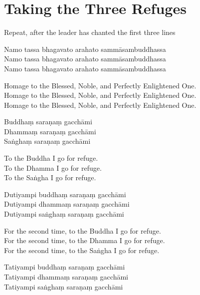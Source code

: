 \clearpage
\chapter{Taking the Three Refuges}%

\begin{instruction}
  Repeat, after the leader has chanted the first three lines
\end{instruction}

Namo tassa bhagavato arahato sammāsambuddhassa\\
Namo tassa bhagavato arahato sammāsambuddhassa\\
Namo tassa bhagavato arahato sammāsambuddhassa

\begin{english}
  Homage to the Blessed, Noble, and Perfectly Enlightened One.\\
  Homage to the Blessed, Noble, and Perfectly Enlightened One.\\
  Homage to the Blessed, Noble, and Perfectly Enlightened One.
\end{english}

Buddhaṃ saraṇaṃ gacchāmi\\
Dhammaṃ saraṇaṃ gacchāmi\\
Saṅghaṃ saraṇaṃ gacchāmi

\begin{english}
  To the Buddha I go for refuge.\\
  To the Dhamma I go for refuge.\\
  To the Saṅgha I go for refuge.
\end{english}

Dutiyampi buddhaṃ saraṇaṃ gacchāmi\\
Dutiyampi dhammaṃ saraṇaṃ gacchāmi\\
Dutiyampi saṅghaṃ saraṇaṃ gacchāmi

\begin{english}
  For the second time, to the Buddha I go for refuge.\\
  For the second time, to the Dhamma I go for refuge.\\
  For the second time, to the Saṅgha I go for refuge.
\end{english}

Tatiyampi buddhaṃ saraṇaṃ gacchāmi\\
Tatiyampi dhammaṃ saraṇaṃ gacchāmi\\
Tatiyampi saṅghaṃ saraṇaṃ gacchāmi

\clearpage

